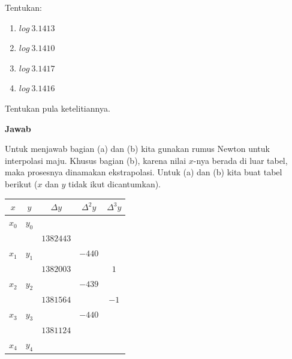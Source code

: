 Tentukan:
\begin{enumerate}
\item $log~3.1413$
\item $log~3.1410$
\item $log~3.1417$
\item $log~3.1416$
\end{enumerate}

Tentukan pula ketelitiannya.

{\bf Jawab}

Untuk menjawab bagian (a) dan (b) kita gunakan rumus Newton untuk interpolasi maju. Khusus bagian (b), karena nilai $x$-nya berada di luar tabel, maka prosesnya dinamakan ekstrapolasi. Untuk (a) dan (b) kita buat tabel berikut ($x$ dan $y$ tidak ikut dicantumkan).

\begin{table}[!htbp]
\centering
\begin{tabular}{@{}|c|c|c|c|c|@{}}
\hline
$x$ & $y$ & $\Delta y$ & $\Delta^2y$ & $\Delta^3y$\\
\hline
$x_0$ & $y_0$ & & &\\
 & & $1382443$ & &\\
$x_1$ & $y_1$ & & $-440$ & \\
 & & $1382003$ & & $1$\\
$x_2$ & $y_2$ & & $-439$ & \\
 & & $1381564$ & & $-1$\\
$x_3$ & $y_3$ & & $-440$ & \\
 & & $1381124$ & &\\
$x_4$ & $y_4$ & & &\\
\hline
\end{tabular}
\end{table}

